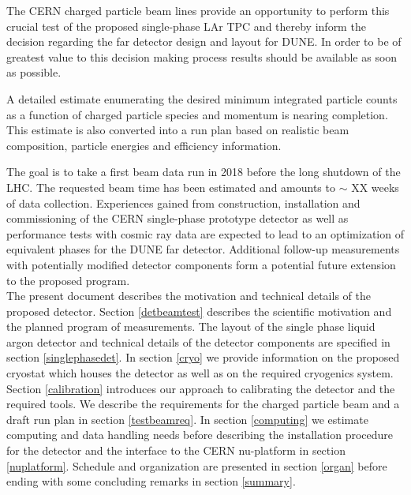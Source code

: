 The CERN charged particle beam lines provide an opportunity to perform this crucial test of the 
proposed single-phase LAr TPC and thereby inform the decision regarding the far detector design and layout for DUNE.
In order to be of greatest value to this decision making process results should be available as soon as possible.


A detailed estimate enumerating the desired minimum integrated particle counts as a function
of charged particle species and momentum is nearing completion. This estimate is also converted 
into a run plan based on realistic beam composition, particle energies and efficiency information. 

The goal is to take a first beam data run in 2018 before the long shutdown of the LHC. 
The requested beam time has been estimated and amounts to {\color{red} $\sim$ XX weeks} of data collection. 
Experiences gained from construction, installation and commissioning of the CERN single-phase prototype detector 
as well as performance tests with cosmic ray data are expected to lead to an optimization of equivalent phases 
for the DUNE far detector. 
Additional follow-up measurements with potentially modified detector components form a potential future extension 
to the proposed program.\\

The present document describes the motivation and technical details of the proposed detector. Section \ref{detbeamtest} describes the scientific motivation and the planned program of measurements. The layout of the single phase liquid argon detector and technical details of the detector components are specified in section \ref{singlephasedet}. In section \ref{cryo} we provide information on the proposed cryostat which houses the detector as well as on the required cryogenics system. Section \ref{calibration} introduces our approach to calibrating the detector and the 
required tools. We describe the requirements for the charged particle beam and a draft run plan in section \ref{testbeamreq}.
In section \ref{computing} we estimate computing and data handling needs before describing the installation procedure for the detector
and the interface to the CERN nu-platform in section \ref{nuplatform}. Schedule and organization are presented in section \ref{organ} before
ending with some concluding remarks in section \ref{summary}.







%






